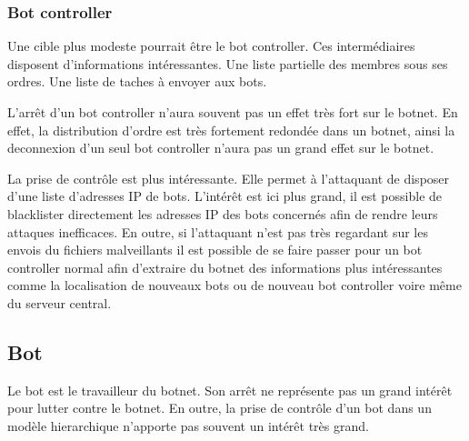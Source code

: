\subsubsection{Bot controller}

Une cible plus modeste pourrait être le bot controller. Ces intermédiaires disposent d'informations intéressantes. Une liste
partielle des membres sous ses ordres. Une liste de taches à envoyer aux bots.

L'arrêt d'un bot controller n'aura souvent pas un effet très fort sur le botnet. En effet, la distribution d'ordre
est très fortement redondée dans un botnet, ainsi la deconnexion d'un seul bot controller n'aura pas un
grand effet sur le botnet.

La prise de contrôle est plus intéressante. Elle permet à l'attaquant de disposer d'une liste d'adresses IP de
bots. L'intérêt est ici plus grand, il est possible de blacklister directement les adresses IP des bots concernés afin
de rendre leurs attaques inefficaces. En outre, si l'attaquant n'est pas très regardant sur les envois du fichiers malveillants
il est possible de se faire passer pour un bot controller normal afin d'extraire du botnet des informations plus intéressantes comme
la localisation de nouveaux bots ou de nouveau bot controller voire même du serveur central.

\subsection{Bot}

Le bot est le travailleur du botnet. Son arrêt ne représente pas un grand intérêt pour lutter contre le botnet.
En outre, la prise de contrôle d'un bot dans un modèle hierarchique n'apporte pas souvent un intérêt très grand.

